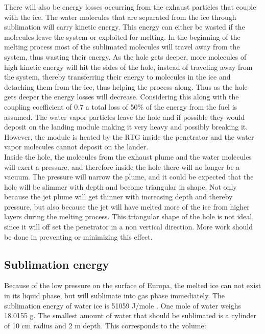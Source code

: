 There will also be energy losses occurring from the exhaust particles that couple with the ice. The water molecules that are separated from the ice through sublimation will carry kinetic energy. This energy can either be wasted if the molecules leave the system or exploited for melting. In the beginning of the melting process most of the sublimated molecules will travel away from the system, thus wasting their energy. As the hole gets deeper, more molecules of high kinetic energy will hit the sides of the hole, instead of traveling away from the system, thereby transferring their energy to molecules in the ice and detaching them from the ice, thus helping the process along. Thus as the hole gets deeper the energy losses will decrease. Considering this along with the coupling coefficient of 0.7 a total loss of 50$\%$ of the energy from the fuel is assumed. The water vapor particles leave the hole and if possible they would deposit on the landing module making it very heavy and possibly breaking it. However, the module is heated by the RTG inside the penetrator and the water vapor molecules cannot deposit on the lander.\\
Inside the hole, the molecules from the exhaust plume and the water molecules will exert a pressure, and therefore inside the hole there will no longer be a vacuum. The pressure will narrow the plume, and it could be expected that the hole will be slimmer with depth and become triangular in shape. Not only because the jet plume will get thinner with increasing depth and thereby pressure, but also because the jet will have melted more of the ice from higher layers during the melting process. This triangular shape of the hole is not ideal, since it will off set the penetrator in a non vertical direction. More work should be done in preventing or minimizing this effect.




\subsection{Sublimation energy}

Because of the low pressure on the surface of Europa, the melted ice can not exist in its liquid phase, but will sublimate into gas phase immediately. The sublimation energy of water ice is 51059 J/mole \cite{water_prop}. One mole of water weighs 18.0155 g. The smallest amount of water that should be sublimated is a cylinder of 10 cm radius and 2 m depth. This corresponds to the volume:

